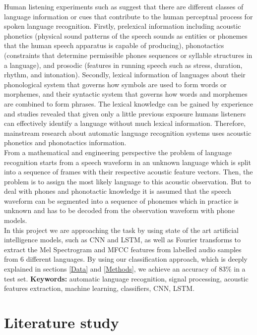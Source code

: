 \documentclass[12pt]{extarticle}
\begin{document}
\noindent Human listening experiments such as \cite{Li2013SpokenLR} suggest that there are different classes of language information or cues that contribute to the human perceptual process for spoken language recognition. Firstly, prelexical information including acoustic phonetics (physical sound patterns of the speech sounds as entities or phonemes that the human speech apparatus is capable of producing), phonotactics (constraints that determine permissible phones sequences or syllable structures in a language), and prosodic (features in running speech such as stress, duration, rhythm, and intonation). Secondly, lexical information of languages about their phonological system that governs how symbols are used to form words or morphemes, and their syntactic system that governs how words and morphemes are combined to form phrases. The lexical knowledge can be gained by experience and studies revealed that given only a little previous exposure humans listeners can effectively identify a language without much lexical information. Therefore, mainstream research about automatic language recognition systems uses acoustic phonetics and phonotactics information.\\

\noindent From a mathematical and engineering perspective the problem of language recognition starts from a speech waveform in an unknown language which is split into a sequence of frames with their respective acoustic feature vectors. Then, the problem is to assign the most likely language to this acoustic observation. But to deal with phones and phonotactic knowledge it is assumed that the speech waveform can be segmented into a sequence of phonemes which in practice is unknown and has to be decoded from the observation waveform with phone models.\\

\noindent In this project we are approaching the task by using state of the art artificial intelligence models, such as CNN and LSTM, as well as Fourier transforms to extract the Mel Spectrogram and MFCC features from labelled audio samples from 6 different languages. By using our classification approach, which is deeply explained in sections \ref{Data} and \ref{Methods}, we achieve an accuracy of 83\% in a test set. \textbf{Keywords:} automatic language recognition, signal processing, acoustic features extraction, machine learning, classifiers, CNN, LSTM.

\section{Literature study}
\end{document}
